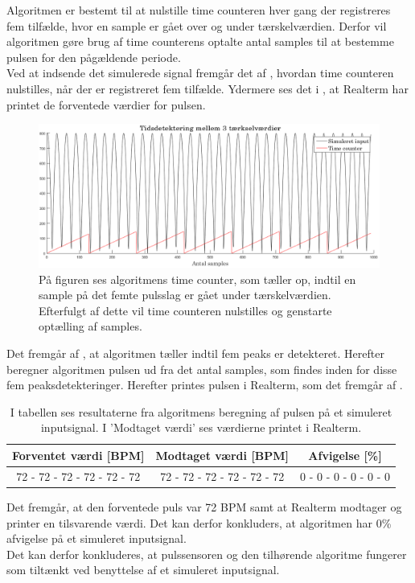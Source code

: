 Algoritmen er bestemt til at nulstille time counteren hver gang der registreres fem tilfælde, hvor en sample er gået over og under tærskelværdien. Derfor vil algoritmen gøre brug af time counterens optalte antal samples til at bestemme pulsen for den pågældende periode. \\
Ved at indsende det simulerede signal fremgår det af , hvordan time counteren nulstilles, når der er registreret fem tilfælde. Ydermere ses det i , at Realterm har printet de forventede værdier for pulsen.
\begin{figure}[H]
	\centering
	\includegraphics[scale=0.34]{figures/cDesign/puls_taerskel.png}
	\caption{På figuren ses algoritmens time counter, som tæller op, indtil en sample på det femte pulsslag er gået under tærskelværdien. Efterfulgt af dette vil time counteren nulstilles og genstarte optælling af samples.}
	\label{fig:timecounter_puls_realterm}
\end{figure}\vspace{-.25cm}
Det fremgår af , at algoritmen tæller indtil fem peaks er detekteret. Herefter beregner algoritmen pulsen ud fra det antal samples, som findes inden for disse fem peaksdetekteringer. Herefter printes pulsen i Realterm, som det fremgår af .
\begin{table}[H]
	\centering
	\begin{tabular}{ccc}
		\hline
		\rowcolor[HTML]{C0C0C0} 
		Forventet værdi [BPM] & Modtaget værdi [BPM] & Afvigelse [\%]\\ \hline
		72 - 72 - 72 - 72 - 72 - 72         & 72 - 72 - 72 - 72 - 72 - 72         & 0 - 0 - 0 - 0 - 0 - 0 \\ \hline
	\end{tabular}
	\caption{I tabellen ses resultaterne fra algoritmens beregning af pulsen på et simuleret inputsignal. I 'Modtaget værdi' ses værdierne printet i Realterm.}
	\label{tab:test_puls_realterm}
\end{table} \vspace{-.25cm}
Det fremgår, at den forventede puls var 72 BPM samt at Realterm modtager og printer en tilsvarende værdi. Det kan derfor konkluders, at algoritmen har 0\% afvigelse på et simuleret inputsignal. \\
Det kan derfor konkluderes, at pulssensoren og den tilhørende algoritme fungerer som tiltænkt ved benyttelse af et simuleret inputsignal. 

